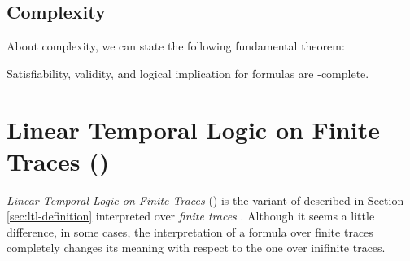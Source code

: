 \subsection{Complexity}
About \LTL complexity, we can state the following fundamental theorem:
\begin{theorem}
Satisfiability, validity, and logical implication for \LTL formulas are \PSPACE-complete.
\end{theorem}
\section{Linear Temporal Logic on Finite Traces (\LTLf)}
\textit{Linear Temporal Logic on Finite Traces} (\LTLf) is the variant of \LTL described in Section \ref{sec:ltl-definition} interpreted over \textit{finite traces} \citep{de2013linear}. Although it seems a little difference, in some cases, the interpretation of a formula over finite traces completely changes its meaning with respect to the one over inifinite traces.
